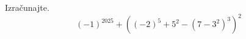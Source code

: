 \documentclass[addpoints]{exam}
\begin{document}
\begin{questions}


        



    
    \question[4]
    Izračunajte.
    $$(-1)^{2025}+\left((-2)^5+5^2-\left(7-3^2\right)^3\right)^2$$





\end{questions}
\end{document}
